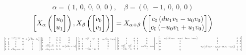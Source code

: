 \documentclass[11pt]{article}
\theoremstyle{definition}
\begin{document}
\[
\alpha = \left( 1, \  0, \  0, \  0, \  0\right), \quad \beta = \left( 0, \  -1, \  0, \  0, \  0\right)
\]
\[
\scaletoalign{\textwidth}{\left[ X_{\alpha}\left(\left[\begin{matrix}u_{0}\\u_{1}\end{matrix}\right]\right), X_{\beta}\left(\left[\begin{matrix}v_{0}\\v_{1}\end{matrix}\right]\right) \right] = X_{\alpha + \beta}\left(\left[\begin{matrix}c_{0} \left(d u_{1} v_{1} - u_{0} v_{0}\right)\\c_{0} \left(- u_{0} v_{1} + u_{1} v_{0}\right)\end{matrix}\right]\right)}
\]
\[
\scaletoalign{\textwidth}{{\left[\begin{matrix}1 & 0 & \frac{c_{0} \left(d u_{1}^{2} - u_{0}^{2}\right)}{2} & 0 & c_{0} \left(\sqrt{d} u_{1} - u_{0}\right)\\0 & 1 & 0 & 0 & 0\\0 & 0 & 1 & 0 & 0\\0 & 0 & 0 & 1 & 0\\0 & 0 & \sqrt{d} u_{1} + u_{0} & 0 & 1\end{matrix}\right]} {\left[\begin{matrix}1 & 0 & 0 & 0 & 0\\0 & 1 & 0 & 0 & 0\\0 & 0 & 1 & 0 & 0\\0 & \frac{c_{0} \left(d v_{1}^{2} - v_{0}^{2}\right)}{2} & 0 & 1 & c_{0} \left(\sqrt{d} v_{1} - v_{0}\right)\\0 & \sqrt{d} v_{1} + v_{0} & 0 & 0 & 1\end{matrix}\right]} {\left[\begin{matrix}1 & 0 & \frac{c_{0} d u_{1}^{2}}{2} - \frac{c_{0} u_{0}^{2}}{2} & 0 & - c_{0} \sqrt{d} u_{1} + c_{0} u_{0}\\0 & 1 & 0 & 0 & 0\\0 & 0 & 1 & 0 & 0\\0 & 0 & 0 & 1 & 0\\0 & 0 & - \sqrt{d} u_{1} - u_{0} & 0 & 1\end{matrix}\right]} {\left[\begin{matrix}1 & 0 & 0 & 0 & 0\\0 & 1 & 0 & 0 & 0\\0 & 0 & 1 & 0 & 0\\0 & \frac{c_{0} d v_{1}^{2}}{2} - \frac{c_{0} v_{0}^{2}}{2} & 0 & 1 & - c_{0} \sqrt{d} v_{1} + c_{0} v_{0}\\0 & - \sqrt{d} v_{1} - v_{0} & 0 & 0 & 1\end{matrix}\right]} = {\left[\begin{matrix}1 & - c_{0} \left(\sqrt{d} \left(u_{0} v_{1} - u_{1} v_{0}\right) - d u_{1} v_{1} + u_{0} v_{0}\right) & 0 & 0 & 0\\0 & 1 & 0 & 0 & 0\\0 & 0 & 1 & 0 & 0\\0 & 0 & - c_{0} \left(\sqrt{d} \left(u_{0} v_{1} - u_{1} v_{0}\right) + d u_{1} v_{1} - u_{0} v_{0}\right) & 1 & 0\\0 & 0 & 0 & 0 & 1\end{matrix}\right]}}
\]
\end{document}

